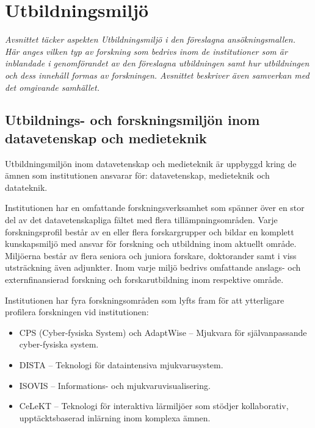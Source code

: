 \chapter{Utbildningsmiljö\label{ch:miljo}}

\begin{tcbdoublebox}
\emph{Avsnittet täcker aspekten Utbildningsmiljö i den föreslagna ansökningsmallen. Här anges vilken typ av forskning som bedrivs inom de institutioner som är inblandade i genomförandet av den föreslagna utbildningen samt hur utbildningen och dess innehåll formas av forskningen. Avsnittet beskriver även samverkan med det omgivande samhället.}
\end{tcbdoublebox}

\section{Utbildnings- och forskningsmiljön inom datavetenskap och
medieteknik}

Utbildningsmiljön inom datavetenskap och medieteknik är uppbyggd kring de ämnen som institutionen ansvarar för: datavetenskap, medieteknik och datateknik.

Institutionen har en omfattande forskningsverksamhet som spänner över en stor del av det datavetenskapliga fältet med flera tillämpningsområden. Varje forskningsprofil består av en eller flera forskargrupper och bildar en komplett kunskapsmiljö med ansvar för forskning och utbildning inom aktuellt område. Miljöerna består av flera seniora och juniora forskare, doktorander samt i viss utsträckning även adjunkter. Inom varje miljö bedrivs omfattande anslags- och externfinansierad forskning och forskarutbildning inom respektive område.

Institutionen har fyra forskningsområden som lyfts fram för att ytterligare profilera forskningen vid institutionen:

\begin{itemize}
\item
  CPS (Cyber-fysiska System) och AdaptWise -- Mjukvara för självanpassande cyber-fysiska
  system.
\item
  DISTA -- Teknologi för dataintensiva mjukvarusystem.
\item
  ISOVIS -- Informations- och mjukvaruvisualisering.
\item
  CeLeKT -- Teknologi för interaktiva lärmiljöer som stödjer kollaborativ, upptäcktsbaserad inlärning inom
  komplexa ämnen. 
\end{itemize}

